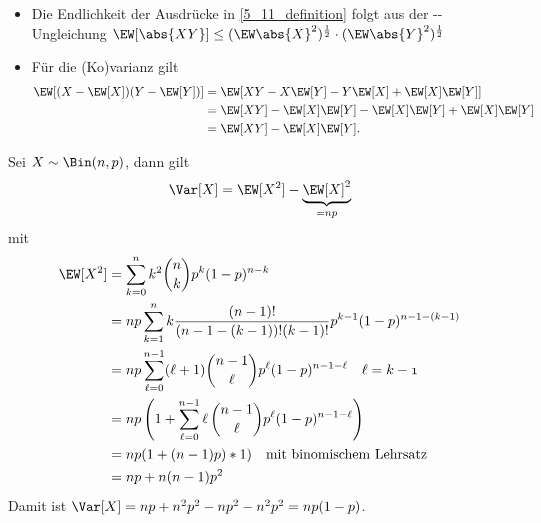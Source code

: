 \begin{*bemerkung}
	\begin{itemize}[leftmargin=*, nolistsep]
		\item Die Endlichkeit der Ausdrücke in \cref{5_11_definition} folgt aus der --Ungleichung
		$\EW[\abs{XY}] \le (\EW\abs{X}^2)^{\frac{1}{2}}\cdot (\EW\abs{Y}^2)^{\frac{1}{2}}$
		\item Für die (Ko)varianz gilt
		\begin{equation*}
			\begin{aligned}
			\EW[{(X -\EW[X])(Y-\EW[Y])}] &= \EW[{XY - X\EW[Y] - Y\EW[X] + \EW[X]\EW[Y]}]\\
			&= \EW[XY] - \EW[X]\EW[Y] - \EW[X]\EW[Y] + \EW[X]\EW[Y]\\
			&= \EW[XY] - \EW[X]\EW[Y].
			\end{aligned}
		\end{equation*}
	\end{itemize}
\end{*bemerkung}

\begin{beispiel}
	\label{5_12_beispiel}
	Sei $X\sim\Bin(n,p)$, dann gilt
	\begin{equation*}
		\Var[X] = \EW[X^2] - \underbrace{\EW[X]^2}_{=np}
	\end{equation*}
	mit
	\begin{equation*}
	\begin{aligned}
		\EW[X^2] &= \sum_{k=0}^n k^2 \binom{n}{k} p^k (1-p)^{n-k} \\
		&= np \sum_{k=1}^n k \frac{(n-1)!}{(n-1-(k-1))!(k-1)!} p^{k-1} (1-p)^{n-1-(k-1)} \\
		&= np \sum_{\ell = 0}^{n-1}(\ell+1)\binom{n-1}{\ell} p^\ell (1-p)^{n-1-\ell} \quad \mit \ell = k-1 \\
		&= np \left(1 + \sum_{\ell=0}^{n-1} \ell \, \binom{n-1}{\ell} p^\ell (1-p)^{n-1-\ell} \right) \\
		&= np (1+(n-1)p) * 1) \quad \text{mit binomischem Lehrsatz} \\
		&= np + n(n-1)p^2 \\
	\end{aligned}
	\end{equation*}
	Damit ist $\Var[X] = np + n^2 p^2 - n p^2 - n^2 p^2 = np(1-p)$.
\end{beispiel}

